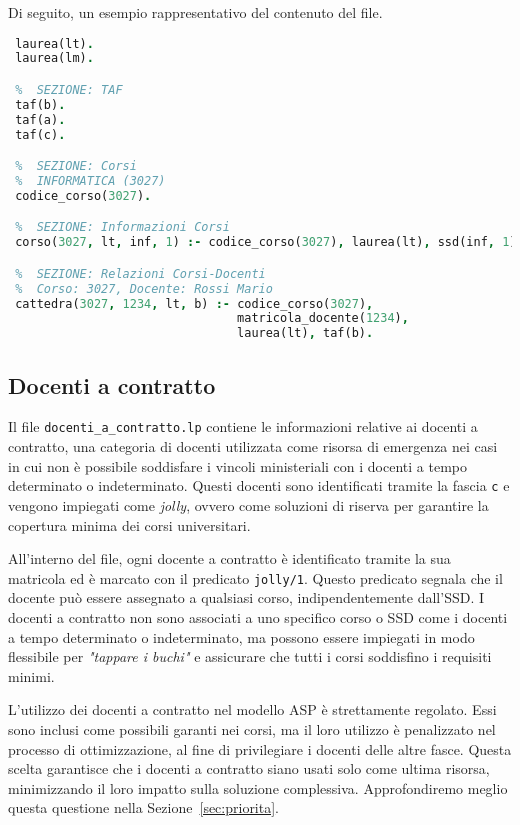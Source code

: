 Di seguito, un esempio rappresentativo del contenuto del file.

\begin{lstlisting}[language=prolog, caption={Esempio struttura dati di \texttt{coperture.lp}.}]    
 %  SEZIONE: Tipi di Corso
 laurea(lt).
 laurea(lm).

 %  SEZIONE: TAF
 taf(b).
 taf(a).
 taf(c).

 %  SEZIONE: Corsi
 %  INFORMATICA (3027)
 codice_corso(3027).

 %  SEZIONE: Informazioni Corsi
 corso(3027, lt, inf, 1) :- codice_corso(3027), laurea(lt), ssd(inf, 1).

 %  SEZIONE: Relazioni Corsi-Docenti
 %  Corso: 3027, Docente: Rossi Mario
 cattedra(3027, 1234, lt, b) :- codice_corso(3027), 
                                matricola_docente(1234), 
                                laurea(lt), taf(b).

\end{lstlisting}


\subsection{Docenti a contratto}\label{sec:rules-docenti-contratto}

Il file \texttt{docenti\_a\_contratto.lp} contiene le informazioni relative ai docenti 
a contratto, una categoria di docenti utilizzata come risorsa di emergenza nei casi in 
cui non è possibile soddisfare i vincoli ministeriali con i docenti a tempo determinato 
o indeterminato. Questi docenti sono identificati tramite la fascia \texttt{c} e vengono 
impiegati come \textit{jolly}, ovvero come soluzioni di riserva per garantire la copertura 
minima dei corsi universitari.

All'interno del file, ogni docente a contratto è identificato tramite la sua matricola 
ed è marcato con il predicato \texttt{jolly/1}. Questo predicato segnala che il docente può 
essere assegnato a qualsiasi corso, indipendentemente dall'SSD. I docenti a contratto 
non sono associati a uno specifico corso o SSD come i docenti a tempo determinato o 
indeterminato, ma possono essere impiegati in modo flessibile per \textit{"tappare i buchi"} 
e assicurare che tutti i corsi soddisfino i requisiti minimi.

L'utilizzo dei docenti a contratto nel modello ASP è strettamente regolato. Essi sono 
inclusi come possibili garanti nei corsi, ma il loro utilizzo è penalizzato nel processo 
di ottimizzazione, al fine di privilegiare i docenti delle altre fasce. Questa scelta 
garantisce che i docenti a contratto siano usati solo come ultima risorsa, minimizzando 
il loro impatto sulla soluzione complessiva. Approfondiremo meglio questa questione nella 
Sezione~\ref*{sec:priorita}.

